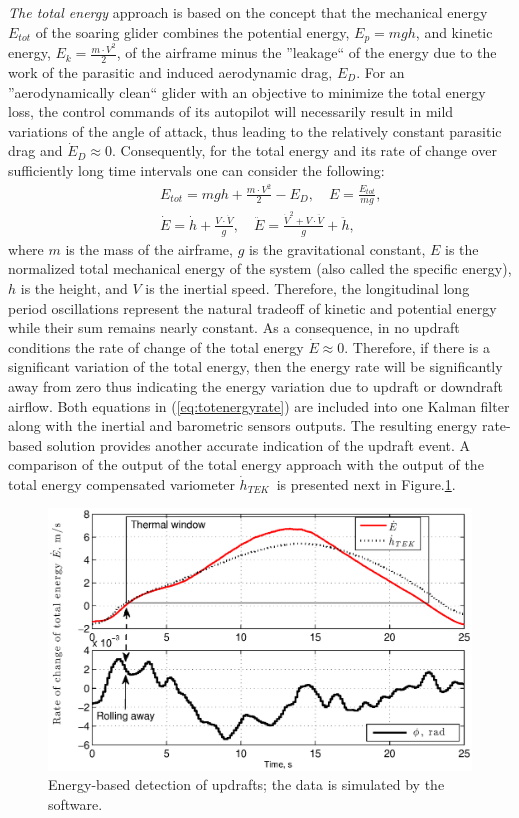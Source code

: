 \documentclass[letterpaper, 10 pt, conference]{ieeeconf}  %
\begin{document}
\emph{The total energy} approach is based on the concept that the mechanical energy $E_{tot}$ of
the soaring glider combines the potential energy, $E_p=mgh$, and kinetic energy, $E_k=\frac{m\cdot V^2}{2}$, of the airframe minus the ''leakage`` of the energy due to the work of the parasitic and induced aerodynamic drag, $E_{D}$. For an ''aerodynamically clean`` glider with an objective to
minimize the total energy loss, the control commands of its autopilot will necessarily result in mild variations of the angle of attack, thus leading to the relatively constant parasitic drag and $\dot{E}_{D}\approx0$. Consequently, for the total energy and its rate of change over sufficiently
long time intervals one can consider the following:
\begin{eqnarray}
    && E_{tot}=mgh+\frac{m\cdot V^2}{2}-E_{D}, \quad E=\frac{E_{tot}}{mg}, \nonumber \\
    && \dot{E}=\dot{h}+\frac{V \cdot \dot{V}}{g}, \quad \ddot{E}=\frac{\dot{V}^2 + V \cdot
    \ddot{V}}{g} + \ddot{h},
    \label{eq:totenergyrate}
\end{eqnarray}
where $m$ is the mass of the airframe, $g$ is the gravitational constant, $E$ is the normalized total mechanical energy of the system (also called the specific energy), $h$ is the height, and $V$ is the inertial speed. Therefore, the longitudinal long period oscillations represent the natural tradeoff of kinetic and potential energy while their sum remains nearly constant. As a consequence, in no updraft conditions the rate of change of the total energy $\dot{E}\approx 0$. Therefore, if there is a significant variation of the total energy, then the energy rate will be significantly away from zero thus indicating the energy variation due to updraft or downdraft airflow. Both equations in (\ref{eq:totenergyrate}) are included into one Kalman filter along with the inertial and barometric sensors outputs. The resulting energy rate-based solution provides another accurate indication of the updraft event. A comparison of the output of the total energy approach with the output of the total energy compensated variometer $\dot{h}_{TEK}$~\cite{PitLab:2013:Online}is presented next in Figure.\ref{fig:ThermalDetection}.
\begin{figure}[thpb]
  \centering
  \includegraphics[scale=0.44]{Figures/TEK_Bank.eps}
  \caption{Energy-based detection of updrafts; the data is simulated
  by the~\cite{Condor:2013:Online} software.}
  \label{fig:ThermalDetection}
\end{figure}
\end{document}
